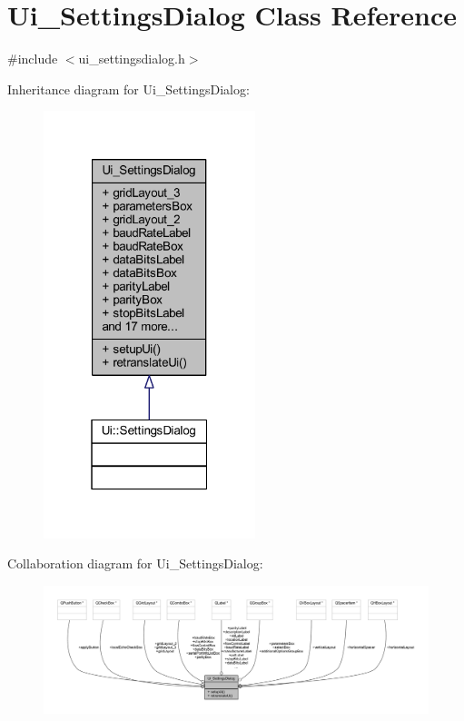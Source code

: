 \hypertarget{a00029}{\section{Ui\+\_\+\+Settings\+Dialog Class Reference}
\label{a00029}
}


{\ttfamily \#include $<$ui\+\_\+settingsdialog.\+h$>$}



Inheritance diagram for Ui\+\_\+\+Settings\+Dialog\+:
\nopagebreak
\begin{figure}[H]
\begin{center}
\leavevmode
\includegraphics[width=175pt]{dd/de2/a00320}
\end{center}
\end{figure}


Collaboration diagram for Ui\+\_\+\+Settings\+Dialog\+:
\nopagebreak
\begin{figure}[H]
\begin{center}
\leavevmode
\includegraphics[width=350pt]{db/d53/a00321}
\end{center}
\end{figure}
